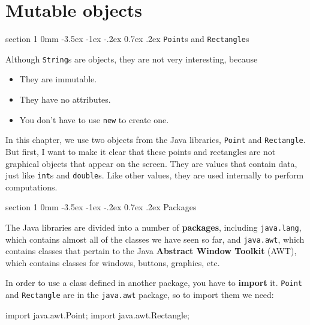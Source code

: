 \documentclass{book}
\makeatletter
\newcounter{exercisenum}
\renewcommand{\section}{\@startsection 
    {section} {1} {0mm}%
    {-3.5ex \@plus -1ex \@minus -.2ex}%
    {0.7ex \@plus.2ex}%
    {\normalfont\Large\bfseries}}
\newcommand{\clearemptydoublepage}{\newpage{\pagestyle{empty}\cleardoublepage}}
\newcommand{\beforechapter}{
    \cleardoublepage 
    \setcounter{exercisenum}{0}
}
\makeatother
\begin{document}
\beforechapter
\chapter{Mutable objects}
\label{chap08}
\label{objects}


\section{{\tt Point}s and {\tt Rectangle}s}

Although {\tt String}s are objects, they are not very interesting,
because

\begin{itemize}

\item They are immutable.

\item They have no attributes.

\item You don't have to use {\tt new} to create one.

\end{itemize}

In this chapter, we use two objects from the Java libraries,
 {\tt Point} and {\tt Rectangle}.
But first, I want to make it clear that these points
and rectangles are not graphical objects that appear on the
screen.  They are values that contain data, just like {\tt int}s
and {\tt double}s.  Like other values, they are used internally
to perform computations.


\section{Packages}

The Java libraries are divided into a number of {\bf
packages}, including {\tt java.lang}, which contains almost all of the
classes we have seen so far, and {\tt java.awt}, which contains
classes that pertain to the Java {\bf Abstract Window Toolkit} (AWT),
which contains classes for windows, buttons, graphics, etc.

In order to use a class defined in another package, you have to {\bf
  import} it.  {\tt Point} and {\tt Rectangle} are in the
{\tt java.awt} package, so to import them we need:

\begin{verbatimtab}
    import java.awt.Point;
    import java.awt.Rectangle;
\end{verbatimtab}
\end{document}
